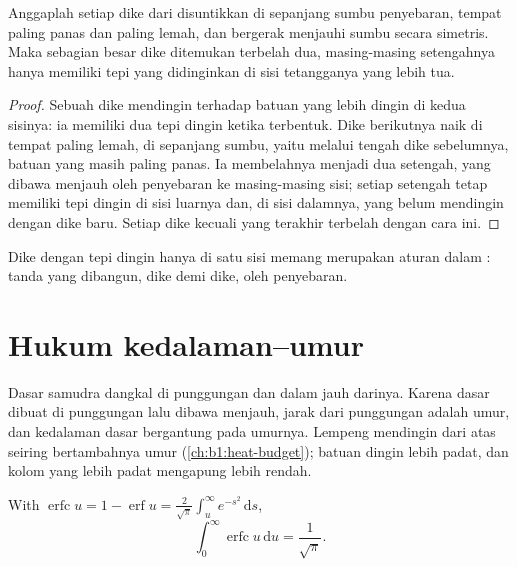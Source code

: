\begin{proposition}\label{prop:b1:rifts-ridges-margins:dykes}
Anggaplah setiap dike dari  disuntikkan di sepanjang sumbu penyebaran, tempat  paling panas dan paling lemah, dan  bergerak menjauhi sumbu secara simetris. Maka sebagian besar dike ditemukan terbelah dua, masing-masing setengahnya hanya memiliki tepi yang didinginkan di sisi tetangganya yang lebih tua.
\end{proposition}

\begin{proof}
Sebuah dike mendingin terhadap batuan yang lebih dingin di kedua sisinya: ia memiliki dua tepi dingin ketika terbentuk. Dike berikutnya naik di tempat  paling lemah, di sepanjang sumbu, yaitu melalui tengah dike sebelumnya, batuan yang masih paling panas. Ia membelahnya menjadi dua setengah, yang dibawa menjauh oleh penyebaran ke masing-masing sisi; setiap setengah tetap memiliki tepi dingin di sisi luarnya dan, di sisi dalamnya,  yang belum mendingin dengan dike baru. Setiap dike kecuali yang terakhir terbelah dengan cara ini.
\end{proof}

Dike dengan tepi dingin hanya di satu sisi memang merupakan aturan dalam : tanda  yang dibangun, dike demi dike, oleh penyebaran.


\section{Hukum kedalaman--umur}\label{sec:b1:rifts-ridges-margins:depth-age}

Dasar samudra dangkal di punggungan dan dalam jauh darinya. Karena dasar dibuat di punggungan lalu dibawa menjauh, jarak dari punggungan adalah umur, dan kedalaman dasar bergantung pada umurnya. Lempeng mendingin dari atas seiring bertambahnya umur (\cref{ch:b1:heat-budget}); batuan dingin lebih padat, dan kolom yang lebih padat mengapung lebih rendah.

\begin{lemma}\label{lem:b1:rifts-ridges-margins:erfc}
With $\operatorname{erfc} u = 1 - \operatorname{erf} u =
\frac{2}{\sqrt\pi}\int_u^\infty e^{-s^2}\,\mathrm ds$,
\[
  \int_0^\infty \operatorname{erfc} u \,\mathrm du = \frac{1}{\sqrt\pi}.
\]
\end{lemma}

